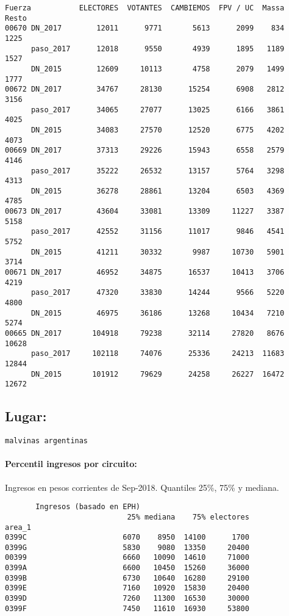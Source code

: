 \documentclass[11pt]{article}
\begin{document}
    \begin{verbatim}
Fuerza           ELECTORES  VOTANTES  CAMBIEMOS  FPV / UC  Massa  Resto
00670 DN_2017        12011      9771       5613      2099    834   1225
      paso_2017      12018      9550       4939      1895   1189   1527
      DN_2015        12609     10113       4758      2079   1499   1777
00672 DN_2017        34767     28130      15254      6908   2812   3156
      paso_2017      34065     27077      13025      6166   3861   4025
      DN_2015        34083     27570      12520      6775   4202   4073
00669 DN_2017        37313     29226      15943      6558   2579   4146
      paso_2017      35222     26532      13157      5764   3298   4313
      DN_2015        36278     28861      13204      6503   4369   4785
00673 DN_2017        43604     33081      13309     11227   3387   5158
      paso_2017      42552     31156      11017      9846   4541   5752
      DN_2015        41211     30332       9987     10730   5901   3714
00671 DN_2017        46952     34875      16537     10413   3706   4219
      paso_2017      47320     33830      14244      9566   5220   4800
      DN_2015        46975     36186      13268     10434   7210   5274
00665 DN_2017       104918     79238      32114     27820   8676  10628
      paso_2017     102118     74076      25336     24213  11683  12844
      DN_2015       101912     79629      24258     26227  16472  12672
    \end{verbatim}

    
    \hypertarget{lugar}{%
\subsection{Lugar:}\label{lugar}}

    
    \begin{Verbatim}[commandchars=\\\{\}]
malvinas argentinas

    \end{Verbatim}

    \hypertarget{percentil-ingresos-por-circuito}{%
\paragraph{Percentil ingresos por
circuito:}\label{percentil-ingresos-por-circuito}}

    
    Ingresos en pesos corrientes de Sep-2018. Quantiles 25\%, 75\% y
mediana.

    
    
    \begin{verbatim}
       Ingresos (basado en EPH)                         
                            25% mediana    75% electores
area_1                                                  
0399C                      6070    8950  14100      1700
0399G                      5830    9080  13350     20400
00399                      6660   10090  14610     71000
0399A                      6600   10450  15260     36000
0399B                      6730   10640  16280     29100
0399E                      7160   10920  15830     20400
0399D                      7260   11300  16530     30000
0399F                      7450   11610  16930     53800
    \end{verbatim}
\end{document}
